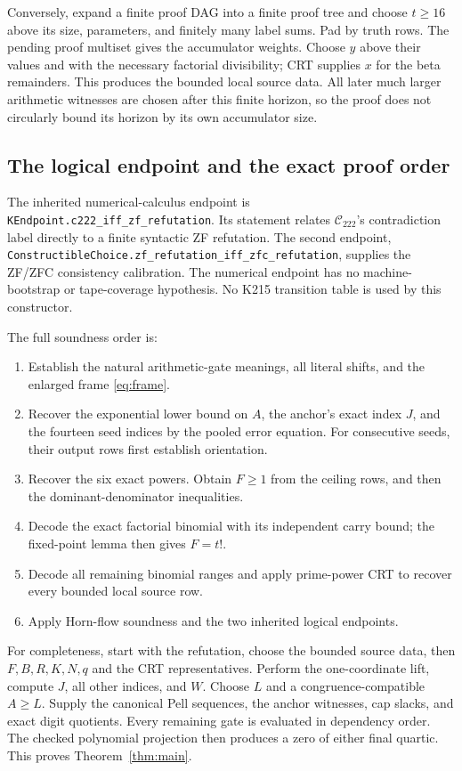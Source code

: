 \documentclass[11pt,a4paper]{article}
\theoremstyle{remark}
\newcommand{\Ccal}{\mathcal C_{222}}
\newcommand{\qref}[1]{\nolinkurl{#1}}
\begin{document}
Conversely, expand a finite proof DAG into a finite proof tree and choose
\(t\ge16\) above its size, parameters, and finitely many label sums.
Pad by truth rows. The pending proof multiset gives the accumulator
weights. Choose \(y\) above their values and with the necessary factorial
divisibility; CRT supplies \(x\) for the beta remainders. This produces
the bounded local source data. All later much larger arithmetic witnesses
are chosen after this finite horizon, so the proof does not circularly
bound its horizon by its own accumulator size.

\subsection{The logical endpoint and the exact proof order}

The inherited numerical-calculus endpoint is
\qref{KEndpoint.c222_iff_zf_refutation}. Its statement relates
\(\Ccal\)'s contradiction label directly to a finite syntactic ZF
refutation. The second endpoint,
\qref{ConstructibleChoice.zf_refutation_iff_zfc_refutation}, supplies
the ZF/ZFC consistency calibration. The numerical endpoint has no
machine-bootstrap or tape-coverage hypothesis. No K215 transition table
is used by this constructor.

The full soundness order is:
\begin{enumerate}[leftmargin=*]
\item Establish the natural arithmetic-gate meanings, all literal shifts,
and the enlarged frame \eqref{eq:frame}.
\item Recover the exponential lower bound on \(A\), the anchor's exact
index \(J\), and the fourteen seed indices by the pooled error equation.
For consecutive seeds, their output rows first establish orientation.
\item Recover the six exact powers. Obtain \(F\ge1\) from the ceiling
rows, and then the dominant-denominator inequalities.
\item Decode the exact factorial binomial with its independent carry bound;
the fixed-point lemma then gives \(F=t!\).
\item Decode all remaining binomial ranges and apply prime-power CRT to
recover every bounded local source row.
\item Apply Horn-flow soundness and the two inherited logical endpoints.
\end{enumerate}
For completeness, start with the refutation, choose the bounded source data,
then \(F,B,R,K,N,q\) and the CRT representatives. Perform the one-coordinate
lift, compute \(J\), all other indices, and \(W\). Choose \(L\) and a
congruence-compatible \(A\ge L\). Supply the canonical Pell sequences,
the anchor witnesses, cap slacks, and exact digit quotients. Every remaining
gate is evaluated in dependency order. The checked polynomial projection
then produces a zero of either final quartic. This proves
Theorem~\ref{thm:main}.
\end{document}
